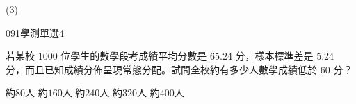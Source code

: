 \begin{QUESTIONS}
\begin{QUESTION}
\begin{QBODY}
        \end{QBODY}
        \begin{QFROMS}
        \end{QFROMS}
        \begin{QTAGS}\end{QTAGS}
        \begin{QANS}
            (3)
        \end{QANS}
        \begin{QSOLLIST}
        \end{QSOLLIST}
        \begin{QEMPTYSPACE}
        \end{QEMPTYSPACE}
    \end{QUESTION}
    \begin{QUESTION}
        \begin{ExamInfo}{091}{學測}{單選}{4}
        \end{ExamInfo}
        \begin{ExamAnsRateInfo}{35}{60}{27}{18}
        \end{ExamAnsRateInfo}
        \begin{QBODY}
            若某校 1000 位學生的數學段考成績平均分數是 65.24 分，樣本標準差是 5.24 分，而且已知成績分佈呈現常態分配。試問全校約有多少人數學成績低於 60 分？
            \begin{QOPS}
                \QOP 約$80$人  
                \QOP 約$160$人 
                \QOP 約$240$人 
                \QOP 約$320$人 
                \QOP 約$400$人
            \end{QOPS}
        

\end{QBODY}
\end{QUESTION}
\end{QUESTIONS}
